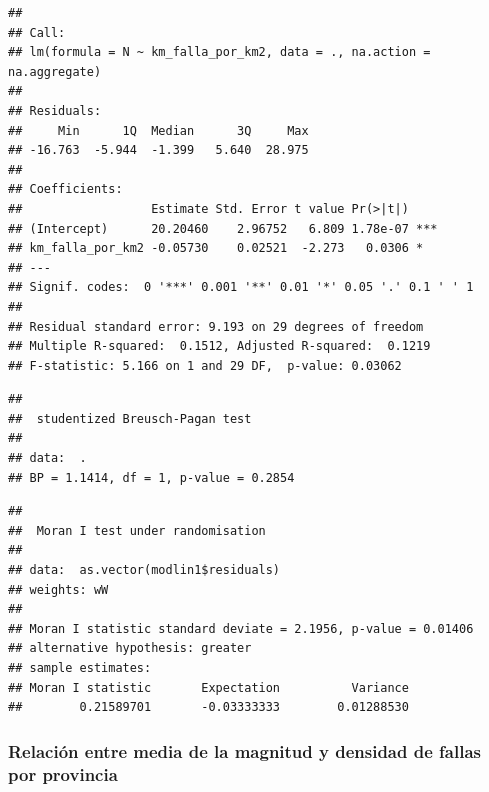 \documentclass[11pt,]{article}
\newenvironment{Shaded}{\begin{snugshade}}{\end{snugshade}}
\newcommand{\KeywordTok}[1]{\textcolor[rgb]{0.13,0.29,0.53}{\textbf{#1}}}
\newcommand{\DataTypeTok}[1]{\textcolor[rgb]{0.13,0.29,0.53}{#1}}
\newcommand{\StringTok}[1]{\textcolor[rgb]{0.31,0.60,0.02}{#1}}
\newcommand{\CommentTok}[1]{\textcolor[rgb]{0.56,0.35,0.01}{\textit{#1}}}
\newcommand{\OperatorTok}[1]{\textcolor[rgb]{0.81,0.36,0.00}{\textbf{#1}}}
\newcommand{\NormalTok}[1]{#1}
\begin{document}
\begin{verbatim}
## 
## Call:
## lm(formula = N ~ km_falla_por_km2, data = ., na.action = na.aggregate)
## 
## Residuals:
##     Min      1Q  Median      3Q     Max 
## -16.763  -5.944  -1.399   5.640  28.975 
## 
## Coefficients:
##                  Estimate Std. Error t value Pr(>|t|)    
## (Intercept)      20.20460    2.96752   6.809 1.78e-07 ***
## km_falla_por_km2 -0.05730    0.02521  -2.273   0.0306 *  
## ---
## Signif. codes:  0 '***' 0.001 '**' 0.01 '*' 0.05 '.' 0.1 ' ' 1
## 
## Residual standard error: 9.193 on 29 degrees of freedom
## Multiple R-squared:  0.1512, Adjusted R-squared:  0.1219 
## F-statistic: 5.166 on 1 and 29 DF,  p-value: 0.03062
\end{verbatim}

\begin{Shaded}
\end{Shaded}

\begin{verbatim}
## 
##  studentized Breusch-Pagan test
## 
## data:  .
## BP = 1.1414, df = 1, p-value = 0.2854
\end{verbatim}

\begin{Shaded}
\end{Shaded}

\begin{verbatim}
## 
##  Moran I test under randomisation
## 
## data:  as.vector(modlin1$residuals)  
## weights: wW    
## 
## Moran I statistic standard deviate = 2.1956, p-value = 0.01406
## alternative hypothesis: greater
## sample estimates:
## Moran I statistic       Expectation          Variance 
##        0.21589701       -0.03333333        0.01288530
\end{verbatim}

\subsubsection{Relación entre media de la magnitud y densidad de fallas
por
provincia}\label{relaciuxf3n-entre-media-de-la-magnitud-y-densidad-de-fallas-por-provincia}
\end{document}
